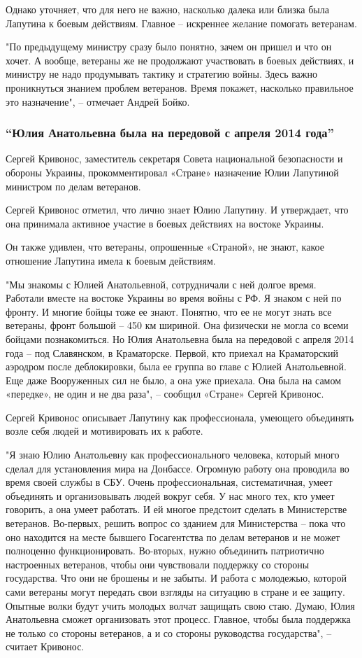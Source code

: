 Однако уточняет, что для него не важно, насколько далека или близка была
Лапутина к боевым действиям. Главное – искреннее желание помогать ветеранам.

"По предыдущему министру сразу было понятно, зачем он пришел и что он хочет. А
вообще, ветераны же не продолжают участвовать в боевых действиях, и министру не
надо продумывать тактику и стратегию войны. Здесь важно проникнуться знанием
проблем ветеранов. Время покажет, насколько правильное это назначение", –
отмечает Андрей Бойко.

\subsubsection{\enquote{Юлия Анатольевна была на передовой с апреля 2014 года}}

Сергей Кривонос, заместитель секретаря Совета национальной безопасности и
обороны Украины, прокомментировал «Стране» назначение Юлии Лапутиной министром
по делам ветеранов.
 
Сергей Кривонос отметил, что лично знает Юлию Лапутину. И утверждает, что она
принимала активное участие в боевых действиях на востоке Украины.
 
Он также удивлен, что ветераны, опрошенные «Страной», не знают, какое отношение
Лапутина имела к боевым действиям.
 
"Мы знакомы с Юлией Анатольевной, сотрудничали с ней долгое время. Работали
вместе на востоке Украины во время войны с РФ. Я знаком с ней по фронту. И
многие бойцы тоже ее знают. Понятно, что ее не могут знать все ветераны, фронт
большой – 450 км шириной. Она физически не могла со всеми бойцами
познакомиться. Но Юлия Анатольевна была на передовой с апреля 2014 года – под
Славянском, в Краматорске. Первой, кто приехал на Краматорский аэродром после
деблокировки, была ее группа во главе с Юлией Анатольевной. Еще даже
Вооруженных сил не было, а она уже приехала. Она была на самом «передке», не
один и не два раза", – сообщил «Стране» Сергей Кривонос.
 
Сергей Кривонос описывает Лапутину как профессионала, умеющего объединять возле
себя людей и мотивировать их к работе.
 
"Я знаю Юлию Анатольевну как профессионального человека, который много сделал
для установления мира на Донбассе. Огромную работу она проводила во время своей
службы в СБУ. Очень профессиональная, систематичная, умеет объединять и
организовывать людей вокруг себя. У нас много тех, кто умеет говорить, а она
умеет работать. И ей многое предстоит сделать в Министерстве ветеранов.
Во-первых, решить вопрос со зданием для Министерства – пока что оно находится
на месте бывшего Госагентства по делам ветеранов и не может полноценно
функционировать. Во-вторых, нужно объединить патриотично настроенных ветеранов,
чтобы они чувствовали поддержку со стороны государства. Что они не брошены и не
забыты. И работа с молодежью, которой сами ветераны могут передать свои взгляды
на ситуацию в стране и ее защиту. Опытные волки будут учить молодых волчат
защищать свою стаю. Думаю, Юлия Анатольевна сможет организовать этот процесс.
Главное, чтобы была поддержка не только со стороны ветеранов, а и со стороны
руководства государства", – считает Кривонос.
